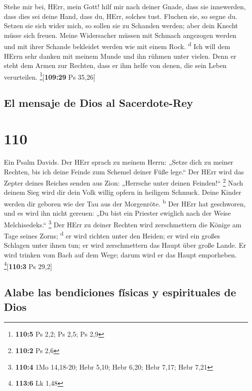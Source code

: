  Stehe mir bei, HErr, mein Gott! hilf mir nach deiner
Gnade,  dass sie innewerden, dass dies sei deine Hand,
dass du, HErr, solches tust.  Fluchen sie, so segne du.
Setzen sie sich wider mich, so sollen sie zu Schanden werden; aber dein
Knecht müsse sich freuen.  Meine Widersacher müssen mit
Schmach angezogen werden und mit ihrer Schande bekleidet werden wie mit
einem Rock. \textsuperscript{d}  Ich will dem HErrn sehr
danken mit meinem Munde und ihn rühmen unter vielen. 
Denn er steht dem Armen zur Rechten, dass er ihm helfe von denen, die
sein Leben verurteilen. \footnote{\textbf{110:5} Ps 2,2; Ps 2,5; Ps 2,9}{[}\textbf{109:29}
Ps 35,26{]}

\hypertarget{el-mensaje-de-dios-al-sacerdote-rey}{%
\subsection{El mensaje de Dios al
Sacerdote-Rey}\label{el-mensaje-de-dios-al-sacerdote-rey}}

\hypertarget{section-109}{%
\section{110}\label{section-109}}

 Ein Psalm Davids. Der HErr sprach zu meinem Herrn: „Setze
dich zu meiner Rechten, bis ich deine Feinde zum Schemel deiner Füße
lege.``  Der HErr wird das Zepter deines Reiches senden
aus Zion: „Herrsche unter deinen Feinden!{}`` \footnote{\textbf{110:2}
  Ps 2,6}  Nach deinem Sieg wird dir dein Volk willig
opfern in heiligem Schmuck. Deine Kinder werden dir geboren wie der Tau
aus der Morgenröte. \textsuperscript{b}  Der HErr hat
geschworen, und es wird ihn nicht gereuen: „Du bist ein Priester
ewiglich nach der Weise Melchisedeks.`` \footnote{\textbf{110:4} 1Mo
  14,18-20; Hebr 5,10; Hebr 6,20; Hebr 7,17; Hebr 7,21} 
Der HErr zu deiner Rechten wird zerschmettern die Könige am Tage seines
Zorns; \textsuperscript{d}  er wird richten unter den
Heiden; er wird ein großes Schlagen unter ihnen tun; er wird
zerschmettern das Haupt über große Lande.  Er wird trinken
vom Bach auf dem Wege; darum wird er das Haupt emporheben.
\footnote{\textbf{113:6} Lk 1,48}{[}\textbf{110:3} Ps 29,2{]}

\hypertarget{alabe-las-bendiciones-fuxedsicas-y-espirituales-de-dios}{%
\subsection{Alabe las bendiciones físicas y espirituales de
Dios}\label{alabe-las-bendiciones-fuxedsicas-y-espirituales-de-dios}}

